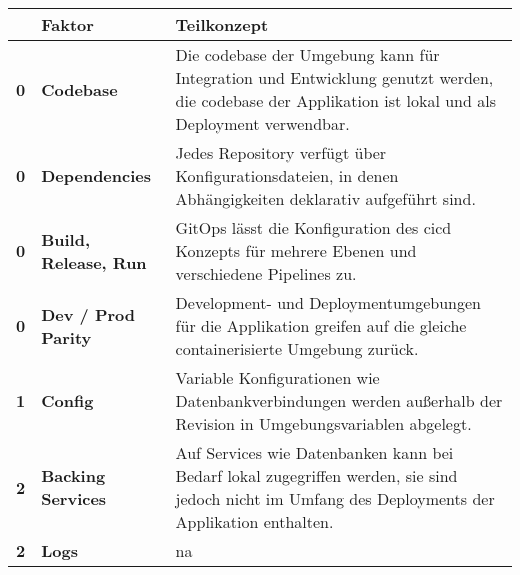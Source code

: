 \setcounter{factorno}{-1}
\begin{table}[H]
    \begin{tabular}{ | >{\bfseries}p{} | >{\raggedright\bfseries}p{} | >{}p{} | }
        \hline
              
            & \textbf{Faktor} 
            & \textbf{Teilkonzept} \\
        \hline \hline
            0
            & %
            Codebase
            & Die \Gls{codebase} der Umgebung kann für Integration und Entwicklung genutzt werden, die \Gls{codebase} der Applikation ist lokal und als Deployment verwendbar. \\
        \hline
            0
            & %
            Dependencies
            & Jedes Repository verfügt über Konfigurationsdateien, in denen Abhängigkeiten deklarativ aufgeführt sind. \\
        \hline
            0
            & %
            Build, Release, Run
            & GitOps lässt die Konfiguration des \Gls{cicd} Konzepts für mehrere Ebenen und verschiedene Pipelines zu. \\
        \hline
            0
            & %
            Dev / Prod Parity
            & Development- und Deploymentumgebungen für die Applikation greifen auf die gleiche containerisierte Umgebung zurück. \\
        \hline
            1
            & %
            Config
            & Variable Konfigurationen wie Datenbankverbindungen werden außerhalb der Revision in Umgebungsvariablen abgelegt. \\
        \hline
            2
            & %
            Backing Services
            & Auf Services wie Datenbanken kann bei Bedarf lokal zugegriffen werden, sie sind jedoch nicht im Umfang des Deployments der Applikation enthalten. \\
        \hline
            2
            & %
            Logs
            & \acrshort{na} \\
        \hline

\end{tabular}
\end{table}
